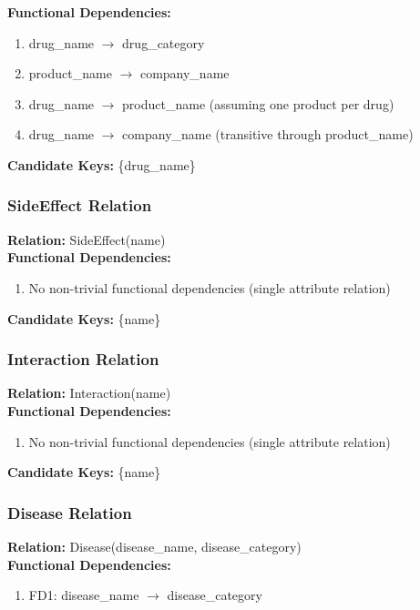 \documentclass[12pt,a4paper]{article}
\begin{document}
\textbf{Functional Dependencies:}
\begin{enumerate}
    \item drug\_name $\rightarrow$ drug\_category
    \item product\_name $\rightarrow$ company\_name
    \item drug\_name $\rightarrow$ product\_name (assuming one product per drug)
    \item drug\_name $\rightarrow$ company\_name (transitive through product\_name)
\end{enumerate}

\textbf{Candidate Keys:} \{drug\_name\}

\subsubsection{SideEffect Relation}
\textbf{Relation:} SideEffect(name)\\

\textbf{Functional Dependencies:}
\begin{enumerate}
    \item No non-trivial functional dependencies (single attribute relation)
\end{enumerate}

\textbf{Candidate Keys:} \{name\}

\subsubsection{Interaction Relation}
\textbf{Relation:} Interaction(name)\\

\textbf{Functional Dependencies:}
\begin{enumerate}
    \item No non-trivial functional dependencies (single attribute relation)
\end{enumerate}

\textbf{Candidate Keys:} \{name\}

\subsubsection{Disease Relation}
\textbf{Relation:} Disease(disease\_name, disease\_category)\\

\textbf{Functional Dependencies:}
\begin{enumerate}
    \item FD1: disease\_name $\rightarrow$ disease\_category
\end{enumerate}
\end{document}
